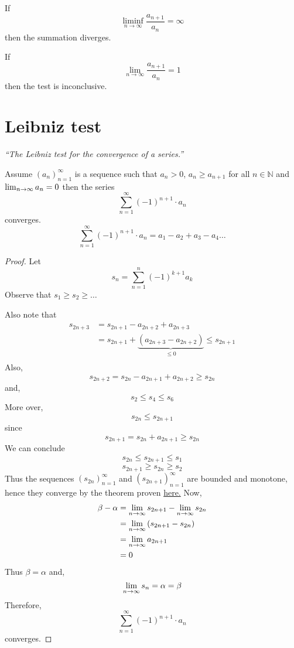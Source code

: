\documentclass[12pt]{report}
\begin{document}
    \begin{remark}
        If 
        \[\liminf_{n \to \infty} \frac{a_{n+1}}{a_n} = \infty\]
        then the summation diverges.
        
        If
        \[\lim_{n \to \infty} \frac{a_{n+1}}{a_n} = 1\]
        then the test is inconclusive.
    \end{remark}
    \section{Leibniz test}
    \textit{``The Leibniz test for the convergence of a series.''} \vspace{3mm}
    \begin{theorem}
        Assume \((a_n)^\infty_{n=1}\) is a sequence such that \(a_n >0\), \(a_n \geq a_{n+1}\) for all \(n \in \mathbb{N}\) and \(\lim_{n \to \infty} a_n = 0\) then the series
        \[\sum^\infty_{n=1} (-1)^{n+1} \cdot a_n\]
        converges.
        \vspace{3mm}
        \[\sum^\infty_{n=1} (-1)^{n+1} \cdot a_n = a_1 - a_2 + a_3 - a_4 \dots\]
    \end{theorem}
    \begin{proof}
        Let 
        \[s_n = \sum^n_{n=1} (-1)^{k+1} a_k\]
        Observe that \(s_1 \geq s_2 \geq \dots\)

        Also note that
        \begin{align*}
            s_{2n+3} &= s_{2n+1} - a_{2n+2} + a_{2n+3}\\
            &= s_{2n+1} + \underbrace{\left(a_{2n+3} - a_{2n+2}\right)}_{\leq 0}  \leq s_{2n+1}\\
        \end{align*}
        Also,
        \[s_{2n+2} = s_{2n} - a_{2n+1} + a_{2n+2} \geq s_{2n}\]
        and,
        \[s_2 \leq s_4 \leq s_6\]
        More over, 
        \[s_{2n} \leq s_{2n+1}\]
        since
        \[s_{2n+1} = s_{2n} + a_{2n+1} \geq s_{2n}\]
        We can conclude
        \[s_{2n} \leq s_{2n+1} \leq s_1\]
        \[s_{2n+1} \geq s_{2n} \geq s_2\]
        Thus the sequences \((s_{2n})^\infty_{n=1}\) and \((s_{2n+1})^\infty_{n=1}\) are bounded and monotone, hence they converge by the theorem proven \hyperref[Convergence of a bounded, monotone sequence]{here.}
        \sidebyside{\[\limtoinfinity{n} s_{2n} = \alpha\]}{\[\limtoinfinity{n} s_{2n+1} = \beta\]}
        Now,
        \begin{align*}
            \beta - \alpha &= \lim_{n \to \infty} s_{2n+1} - \lim_{n \to \infty} s_{2n}\\
            &= \lim_{n \to \infty} \left(s_{2n+1} - s_{2n}\right)\\
            &= \lim_{n \to \infty} a_{2n+1}\\
            &= 0
        \end{align*}
        Thus \(\beta = \alpha\) and,
        \[\lim_{n \to \infty} s_{n} = \alpha = \beta\]
        Therefore,
        \[\sum^\infty_{n=1} (-1)^{n+1} \cdot a_n\]
        converges.
    \end{proof}
\end{document}
